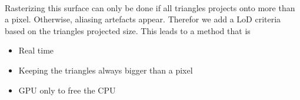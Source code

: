 \paragraph{}
Rasterizing this surface can only be done if all triangles projects onto more than a pixel.
Otherwise, aliasing artefacts appear.
Therefor we add a LoD criteria based on the triangles projected size.
This leads to a method that is 
\begin{itemize}
	\item Real time
	\item Keeping the triangles always bigger than a pixel
	\item GPU only to free the CPU
\end{itemize}